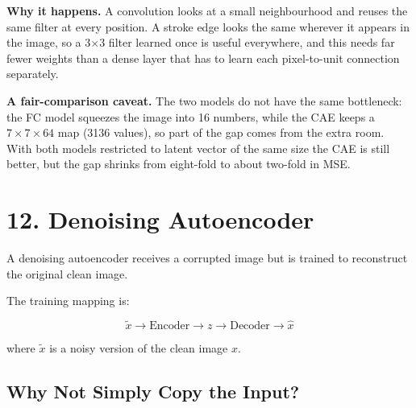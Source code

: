 \documentclass[10pt]{article}
\begin{document}
\textbf{Why it happens.} A convolution looks at a small neighbourhood and
reuses the same filter at every position. A stroke edge looks the same wherever
it appears in the image, so a 3$\times$3 filter learned once is useful
everywhere, and this needs far fewer weights than a dense layer that has to
learn each pixel-to-unit connection separately.

\textbf{A fair-comparison caveat.} The two models do not have the same bottleneck:
the FC model squeezes the image into 16 numbers, while the CAE keeps a
$7\times7\times64$ map (3136 values), so part of the gap comes from the extra
room. With both models restricted to latent vector of the same size the CAE is still better, but the gap shrinks from eight-fold to
about two-fold in MSE.

\section*{12. Denoising Autoencoder}

A denoising autoencoder receives a corrupted image but is trained to
reconstruct the original clean image.

The training mapping is:

\[
\boxed{\tilde{x}\rightarrow\text{Encoder}\rightarrow z
\rightarrow\text{Decoder}\rightarrow\hat{x}}
\]

where $\tilde{x}$ is a noisy version of the clean image $x$.

\begin{center}
\end{center}

\subsection*{Why Not Simply Copy the Input?}
\end{document}

